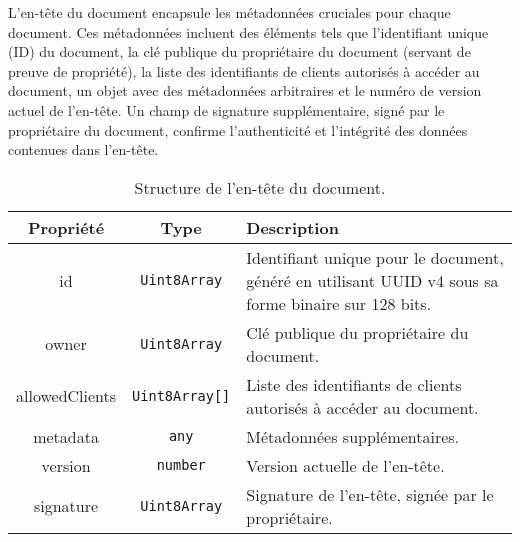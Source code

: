 L'en-tête du document encapsule les métadonnées cruciales pour chaque document.
Ces métadonnées incluent des éléments tels que l'identifiant unique (ID) du document, la clé publique du propriétaire du document (servant de preuve de propriété), la liste des identifiants de clients autorisés à accéder au document, un objet avec des métadonnées arbitraires et le numéro de version actuel de l'en-tête. Un champ de signature supplémentaire, signé par le propriétaire du document, confirme l'authenticité et l'intégrité des données contenues dans l'en-tête.

\setlength{\extrarowheight}{2pt}

\begin{table}[h]
  \begin{center}
    \caption{Structure de l'en-tête du document.}
    \begin{tabularx}{\textwidth}{|c|c|X|}
      \hline
      \rowcolor{gray!20}
      \textbf{Propriété} & \textbf{Type}         & \textbf{Description}                                                                                 \\
      \hline
      id                 & \texttt{Uint8Array}   & Identifiant unique pour le document, généré en utilisant UUID v4 sous sa forme binaire sur 128 bits. \\
      \hline
      owner              & \texttt{Uint8Array}   & Clé publique du propriétaire du document.                                                            \\
      \hline
      allowedClients     & \texttt{Uint8Array[]} & Liste des identifiants de clients autorisés à accéder au document.                                   \\
      \hline
      metadata           & \texttt{any}          & Métadonnées supplémentaires.                                                                         \\
      \hline
      version            & \texttt{number}       & Version actuelle de l'en-tête.                                                                       \\
      \hline
      signature          & \texttt{Uint8Array}   & Signature de l'en-tête, signée par le propriétaire.                                                  \\
      \hline
    \end{tabularx}
  \end{center}
\end{table}



